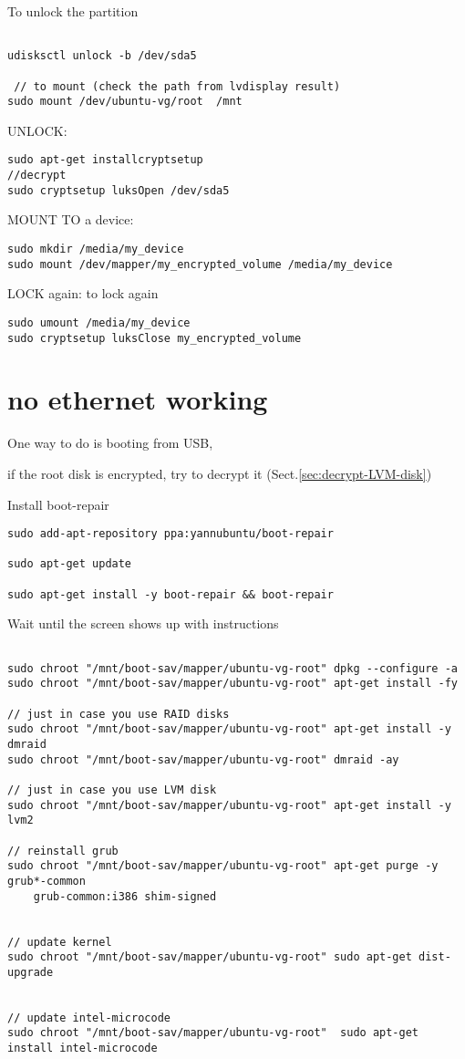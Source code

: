 To unlock the partition
\begin{verbatim}

udisksctl unlock -b /dev/sda5

 // to mount (check the path from lvdisplay result)
sudo mount /dev/ubuntu-vg/root  /mnt
\end{verbatim}

UNLOCK: 
\begin{verbatim}
sudo apt-get installcryptsetup
//decrypt
sudo cryptsetup luksOpen /dev/sda5
\end{verbatim}

MOUNT TO a device:
\begin{verbatim}
sudo mkdir /media/my_device
sudo mount /dev/mapper/my_encrypted_volume /media/my_device
\end{verbatim}

LOCK again:
to lock again
\begin{verbatim}
sudo umount /media/my_device
sudo cryptsetup luksClose my_encrypted_volume
\end{verbatim}

\section{no ethernet working}


One way to do is booting from USB, 

if the root disk is encrypted, try to decrypt it
(Sect.\ref{sec:decrypt-LVM-disk})

Install boot-repair
\begin{verbatim}
sudo add-apt-repository ppa:yannubuntu/boot-repair

sudo apt-get update

sudo apt-get install -y boot-repair && boot-repair 

\end{verbatim}

Wait until the screen shows up with instructions
\begin{verbatim}

sudo chroot "/mnt/boot-sav/mapper/ubuntu-vg-root" dpkg --configure -a
sudo chroot "/mnt/boot-sav/mapper/ubuntu-vg-root" apt-get install -fy

// just in case you use RAID disks
sudo chroot "/mnt/boot-sav/mapper/ubuntu-vg-root" apt-get install -y dmraid
sudo chroot "/mnt/boot-sav/mapper/ubuntu-vg-root" dmraid -ay

// just in case you use LVM disk
sudo chroot "/mnt/boot-sav/mapper/ubuntu-vg-root" apt-get install -y lvm2

// reinstall grub
sudo chroot "/mnt/boot-sav/mapper/ubuntu-vg-root" apt-get purge -y grub*-common
    grub-common:i386 shim-signed


// update kernel 
sudo chroot "/mnt/boot-sav/mapper/ubuntu-vg-root" sudo apt-get dist-upgrade


// update intel-microcode
sudo chroot "/mnt/boot-sav/mapper/ubuntu-vg-root"  sudo apt-get install intel-microcode
\end{verbatim}



